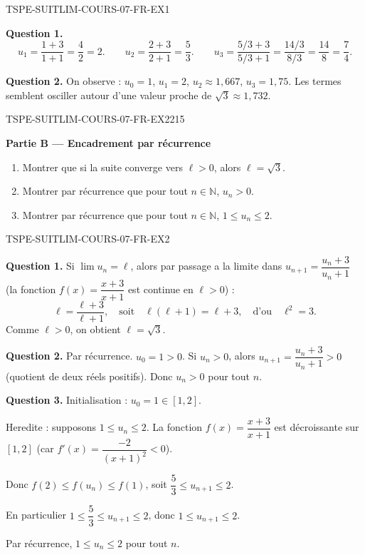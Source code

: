 \begin{corrige}{TSPE-SUITLIM-COURS-07-FR-EX1}

\textbf{Question 1.}
\[
u_1 = \frac{1 + 3}{1 + 1} = \frac{4}{2} = 2. \qquad
u_2 = \frac{2 + 3}{2 + 1} = \frac{5}{3}. \qquad
u_3 = \frac{5/3 + 3}{5/3 + 1} = \frac{14/3}{8/3} = \frac{14}{8} = \frac{7}{4}.
\]

\textbf{Question 2.} On observe : $u_0 = 1$, $u_1 = 2$, $u_2 \approx 1{,}667$, $u_3 = 1{,}75$. Les termes semblent osciller autour d'une valeur proche de $\sqrt{3} \approx 1{,}732$.

\end{corrige}

\bigskip


\begin{exercice}{TSPE-SUITLIM-COURS-07-FR-EX2}{2}{15}

\textbf{Partie B — Encadrement par récurrence}

\begin{enumerate}
  \item Montrer que si la suite converge vers $\ell > 0$, alors $\ell = \sqrt{3}$.
  \item Montrer par récurrence que pour tout $n \in \mathbb{N}$, $u_n > 0$.
  \item Montrer par récurrence que pour tout $n \in \mathbb{N}$, $1 \leq u_n \leq 2$.
\end{enumerate}

\end{exercice}

\begin{corrige}{TSPE-SUITLIM-COURS-07-FR-EX2}

\textbf{Question 1.} Si $\lim u_n = \ell$, alors par passage a la limite dans $u_{n+1} = \dfrac{u_n + 3}{u_n + 1}$ (la fonction $f(x) = \dfrac{x+3}{x+1}$ est continue en $\ell > 0$) :
\[
\ell = \frac{\ell + 3}{\ell + 1}, \quad \text{soit} \quad \ell(\ell + 1) = \ell + 3, \quad \text{d'ou} \quad \ell^2 = 3.
\]
Comme $\ell > 0$, on obtient $\ell = \sqrt{3}$.

\textbf{Question 2.} Par récurrence. $u_0 = 1 > 0$. Si $u_n > 0$, alors $u_{n+1} = \dfrac{u_n + 3}{u_n + 1} > 0$ (quotient de deux réels positifs). Donc $u_n > 0$ pour tout $n$.

\textbf{Question 3.} Initialisation : $u_0 = 1 \in [1, 2]$.

Heredite : supposons $1 \leq u_n \leq 2$. La fonction $f(x) = \dfrac{x+3}{x+1}$ est décroissante sur $[1, 2]$ (car $f'(x) = \dfrac{-2}{(x+1)^2} < 0$).

Donc $f(2) \leq f(u_n) \leq f(1)$, soit $\dfrac{5}{3} \leq u_{n+1} \leq 2$.

En particulier $1 \leq \dfrac{5}{3} \leq u_{n+1} \leq 2$, donc $1 \leq u_{n+1} \leq 2$.

Par récurrence, $1 \leq u_n \leq 2$ pour tout $n$.

\end{corrige}

